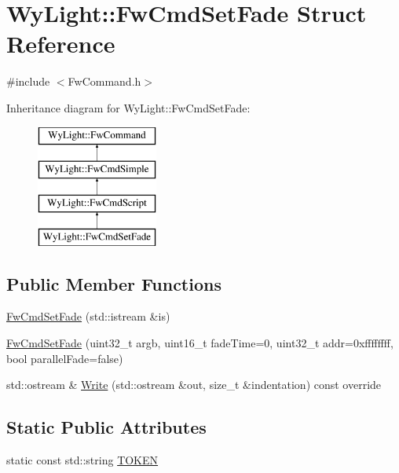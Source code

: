 \hypertarget{struct_wy_light_1_1_fw_cmd_set_fade}{\section{Wy\-Light\-:\-:Fw\-Cmd\-Set\-Fade Struct Reference}
\label{struct_wy_light_1_1_fw_cmd_set_fade}
}


{\ttfamily \#include $<$Fw\-Command.\-h$>$}

Inheritance diagram for Wy\-Light\-:\-:Fw\-Cmd\-Set\-Fade\-:\begin{figure}[H]
\begin{center}
\leavevmode
\includegraphics[height=4.000000cm]{struct_wy_light_1_1_fw_cmd_set_fade}
\end{center}
\end{figure}
\subsection*{Public Member Functions}
\begin{DoxyCompactItemize}
\item 
\hyperlink{struct_wy_light_1_1_fw_cmd_set_fade_a2338914407d05d11200e6c823d9575b0}{Fw\-Cmd\-Set\-Fade} (std\-::istream \&is)
\item 
\hyperlink{struct_wy_light_1_1_fw_cmd_set_fade_a805da076fa5c6d2aaaf31a6b9ac61f62}{Fw\-Cmd\-Set\-Fade} (uint32\-\_\-t argb, uint16\-\_\-t fade\-Time=0, uint32\-\_\-t addr=0xffffffff, bool parallel\-Fade=false)
\item 
std\-::ostream \& \hyperlink{struct_wy_light_1_1_fw_cmd_set_fade_a2e6cf2016152c098c3b9706c43747010}{Write} (std\-::ostream \&out, size\-\_\-t \&indentation) const override
\end{DoxyCompactItemize}
\subsection*{Static Public Attributes}
\begin{DoxyCompactItemize}
\item 
static const std\-::string \hyperlink{struct_wy_light_1_1_fw_cmd_set_fade_a43d478936fa849d3e3ac95775ce287b6}{T\-O\-K\-E\-N}
\end{DoxyCompactItemize}
